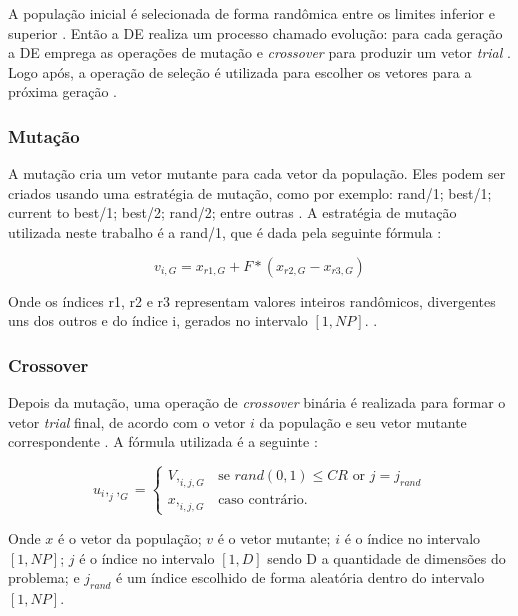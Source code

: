 A população inicial é selecionada de forma randômica entre os limites inferior e superior \cite{brest}. Então a DE realiza um processo chamado evolução: para cada geração a DE emprega as operações de mutação e \textit{crossover} para produzir um vetor \textit{trial} \cite{brest}. Logo após, a operação de seleção é utilizada para escolher os vetores para a próxima geração \cite{brest}. 

\subsubsection{Mutação}

A mutação cria um vetor mutante para cada vetor da população. Eles podem ser criados usando uma estratégia de mutação, como por exemplo: rand/1; best/1; current to best/1; best/2; rand/2; entre outras \cite{brest}. A estratégia de mutação utilizada neste trabalho é a rand/1, que é dada pela seguinte fórmula \cite{brest}:

\begin{equation}
v_{i,G} =  x_{r1,G} + F * (x_{r2,G} - x_{r3,G}) 
\end{equation}

Onde os índices r1, r2 e r3 representam valores inteiros randômicos, divergentes uns dos outros e do índice i, gerados no intervalo $[1, NP]$. \cite{brest}.

\subsubsection{Crossover}

Depois da mutação, uma operação de \textit{crossover} binária é realizada para formar o vetor \textit{trial} final, de acordo com o vetor $i$ da população e seu vetor mutante correspondente \cite{brest}. A fórmula utilizada é a seguinte \cite{brest}:

\begin{equation}
u_i,_j,_G = 
\begin{cases}
	V,_{i,j,G}    & \text{se $rand(0, 1) \leq CR$ or $j = j_{rand}$}\\
    x,_{i,j,G} & \text{caso contrário.}
\end{cases}
\end{equation}

Onde $x$ é o vetor da população; $v$ é o vetor mutante; $i$ é o índice no intervalo $[1, NP]$; $j$ é o índice no intervalo $[1, D]$ sendo D a quantidade de dimensões do problema; e $j_{rand}$ é um índice escolhido de forma aleatória dentro do intervalo $[1, NP]$. 

